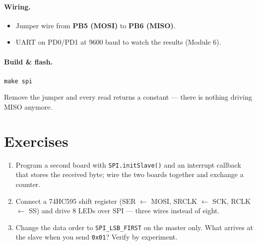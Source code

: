 \documentclass[11pt,a4paper]{article}
\begin{document}
\paragraph{Wiring.}
\begin{itemize}
  \item Jumper wire from \textbf{PB5 (MOSI)} to \textbf{PB6 (MISO)}.
  \item UART on PD0/PD1 at 9600 baud to watch the results (Module 6).
\end{itemize}

\paragraph{Build \& flash.} \texttt{make spi}



Remove the jumper and every read returns a constant --- there is nothing
driving MISO anymore.

\section{Exercises}

\begin{enumerate}
  \item Program a second board with \texttt{SPI.initSlave()} and an interrupt
        callback that stores the received byte; wire the two boards together
        and exchange a counter.
  \item Connect a 74HC595 shift register (SER $\leftarrow$ MOSI, SRCLK
        $\leftarrow$ SCK, RCLK $\leftarrow$ SS) and drive 8 LEDs over SPI ---
        three wires instead of eight.
  \item Change the data order to \texttt{SPI\_LSB\_FIRST} on the master only.
        What arrives at the slave when you send \texttt{0x01}? Verify by
        experiment.
\end{enumerate}
\end{document}
